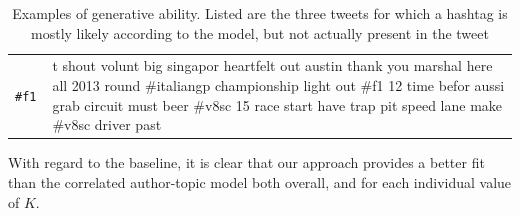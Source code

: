\begin{table}
  \begin{tabular}{l || l} \hline 
  \tt{\#f1} & t shout volunt big singapor heartfelt out austin thank you marshal here all
2013 round #italiangp championship light out #f1 12 time
befor aussi grab circuit must beer #v8sc 15 race start
have trap pit speed lane make #v8sc driver past
  \end{tabular}
  \caption{Examples of generative ability. Listed are the three tweets for which a hashtag is mostly likely according to the model, but not actually present in the tweet}
\end{table}


With regard to the baseline, it is clear that our approach provides a better fit than the correlated author-topic model both overall, and for each individual value of $K$.



